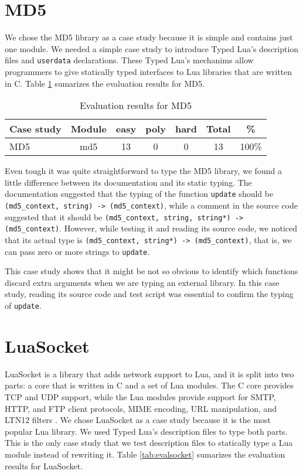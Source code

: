 \section{MD5}

We chose the MD5 library \citep{lmd5} as a case study because it is
simple and contains just one module.
We needed a simple case study to introduce Typed Lua's description
files and \texttt{userdata} declarations.
These Typed Lua's mechanims allow programmers to give statically typed
interfaces to Lua libraries that are written in C.
Table \ref{tab:evalmd5} sumarizes the evaluation results for MD5.

\begin{table}[!ht]
\begin{center}
\begin{tabular}{|l|c|c|c|c|c|c|}
\hline
\textbf{Case study} & \textbf{Module} & \textbf{easy} & \textbf{poly} & \textbf{hard} & \textbf{Total} & \textbf{\%} \\
\hline
\multirow{1}{*}{MD5}
& md5 & 13 & 0 & 0 & 13 & 100\% \\
\hline
\end{tabular}
\end{center}
\caption{Evaluation results for MD5}
\label{tab:evalmd5}
\end{table}

Even tough it was quite straightforward to type the MD5 library,
we found a little difference between its documentation and its static typing.
The documentation suggested that the typing of the function \texttt{update}
should be \texttt{(md5\string_context, string) -> (md5\string_context)},
while a comment in the source code suggested that it should be
\texttt{(md5\string_context, string, string*) -> (md5\string_context)}.
However, while testing it and reading its source code, we noticed that
its actual type is \texttt{(md5\string_context, string*) -> (md5\string_context)},
that is, we can pass zero or more strings to \texttt{update}.

This case study shows that it might be not so obvious to identify which
functions discard extra arguments when we are typing an external library.
In this case study, reading its source code and test script was essential
to confirm the typing of \texttt{update}.

\section{LuaSocket}

LuaSocket \citep{luasocket} is a library that adds network support to Lua,
and it is split into two parts: a core that is written in C and a set of
Lua modules.
The C core provides TCP and UDP support, while the Lua modules provide
support for SMTP, HTTP, and FTP client protocols, MIME encoding,
URL manipulation, and LTN12 filters \citep{nehab2008ltn012}.
We chose LuaSocket as a case study because it is the most popular Lua library.
We used Typed Lua's description files to type both parts.
This is the only case study that we test description files to statically type
a Lua module instead of rewriting it.
Table \ref{tab:evalsocket} sumarizes the evaluation results for LuaSocket.

